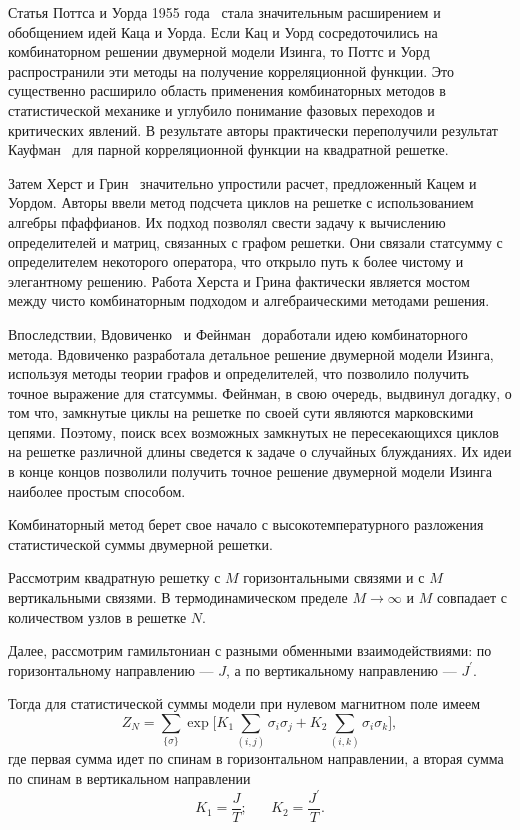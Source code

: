 Статья Поттса и Уорда 1955 года~\cite{potts1955} стала значительным расширением и обобщением идей Каца и Уорда. Если Кац и Уорд сосредоточились на комбинаторном решении двумерной модели Изинга, то Поттс и Уорд распространили эти методы на получение корреляционной функции. Это существенно расширило область применения комбинаторных методов в статистической механике и углубило понимание фазовых переходов и критических явлений. В результате авторы практически переполучили результат Кауфман~\cite{kaufman1949} для парной корреляционной функции на квадратной решетке.

Затем Херст и Грин~\cite{hurst1960} значительно упростили расчет, предложенный Кацем и Уордом. Авторы ввели метод подсчета циклов на решетке с использованием алгебры пфаффианов. Их подход позволял свести задачу к вычислению определителей и матриц, связанных с графом решетки. Они связали статсумму с определителем некоторого оператора, что открыло путь к более чистому и элегантному решению. Работа Херста и Грина фактически является мостом между чисто комбинаторным подходом и алгебраическими методами решения.

Впоследствии, Вдовиченко~\cite{vdovichenko1965_1, vdovichenko1965_2} и Фейнман~\cite{feynmann1972} доработали идею комбинаторного метода. Вдовиченко разработала детальное решение двумерной модели Изинга, используя методы теории графов и определителей, что позволило получить точное выражение для статсуммы. Фейнман, в свою очередь, выдвинул догадку, о том что, замкнутые циклы на решетке по своей сути являются марковскими цепями. Поэтому, поиск всех возможных замкнутых не пересекающихся циклов на решетке различной длины сведется к задаче о случайных блужданиях. Их идеи в конце концов позволили получить точное решение двумерной модели Изинга наиболее простым способом.

Комбинаторный метод берет свое начало с высокотемпературного разложения статистической суммы двумерной решетки. 

Рассмотрим квадратную решетку с $M$ горизонтальными связями и с $M$ вертикальными связями. В термодинамическом пределе $M \rightarrow \infty$ и $M$ совпадает с количеством узлов в решетке $N$. 

Далее, рассмотрим гамильтониан с разными обменными взаимодействиями: по горизонтальному направлению --- $J$, а по вертикальному направлению --- $J^{'}$.

Тогда для статистической суммы модели при нулевом магнитном поле имеем
\begin{equation}
Z_{N} = \sum_{\{\sigma\}} \exp{\bigg[ K_1 \sum_{(i,j)} \sigma_i \sigma_j + K_2 \sum_{(i,k)} \sigma_i \sigma_k\bigg]},
\end{equation}
где первая сумма идет по спинам в горизонтальном направлении, а вторая сумма по спинам в вертикальном направлении
\begin{equation*}
K_1 = \frac{J}{T}; \;\;\;\;\;\; K_2 = \frac{J^{'}}{T}.
\end{equation*}


